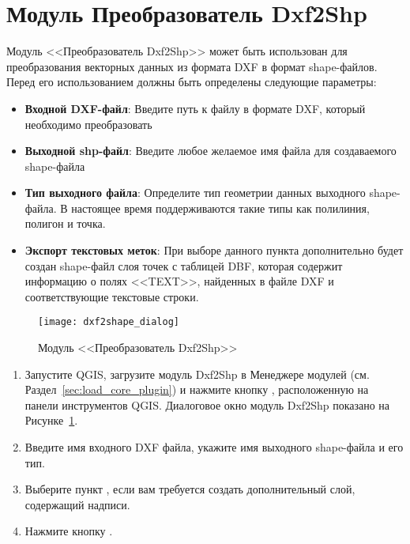 
\section{Модуль Преобразователь Dxf2Shp}


Модуль <<Преобразователь Dxf2Shp>> может быть использован для преобразования
векторных данных из формата DXF в формат shape-файлов. Перед его
использованием должны быть определены следующие параметры:

\begin{itemize}
\item \textbf{Входной DXF-файл}: Введите путь к файлу в формате DXF,
который необходимо преобразовать
\item \textbf{Выходной shp-файл}: Введите любое желаемое имя файла для
создаваемого shape-файла
\item \textbf{Тип выходного файла}: Определите тип геометрии данных
выходного shape-файла. В настоящее время поддерживаются такие типы как
полилиния, полигон и точка.
\item \textbf{Экспорт текстовых меток}: При выборе данного пункта
дополнительно будет создан shape-файл слоя точек с
таблицей DBF, которая содержит информацию о полях <<TEXT>>, найденных в
файле DXF и соответствующие текстовые строки.
\end{itemize}

\begin{figure}[ht]
   \centering
   \texttt{[image: dxf2shape\_dialog]}
   \caption{Модуль <<Преобразователь Dxf2Shp>> \wincaption}\label{fig:dxf2shape_dialog}
\end{figure}


\begin{enumerate}
  \item Запустите QGIS, загрузите модуль Dxf2Shp в Менеджере модулей
  (см. Раздел~\ref{sec:load_core_plugin}) и нажмите кнопку
  , расположенную на
  панели инструментов QGIS. Диалоговое окно модуль Dxf2Shp показано на
  Рисунке~\ref{fig:dxf2shape_dialog}.
  \item Введите имя входного DXF файла, укажите имя выходного shape-файла
  и его тип.
  \item Выберите пункт , если вам
  требуется создать дополнительный слой, содержащий надписи.
  \item Нажмите кнопку .
\end{enumerate}

\FloatBarrier
